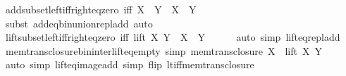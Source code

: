 \begin{isabellebody}
\ add{\isacharunderscore}{\kern0pt}subset{\isacharunderscore}{\kern0pt}left{\isacharunderscore}{\kern0pt}iff{\isacharunderscore}{\kern0pt}right{\isacharunderscore}{\kern0pt}eq{\isacharunderscore}{\kern0pt}zero\ {\isacharbrackleft}{\kern0pt}iff{\isacharbrackright}{\kern0pt}{\isacharcolon}{\kern0pt}\ {\isachardoublequoteopen}X\ {\isacharplus}{\kern0pt}\ Y\ {\isasymsubseteq}\ X\ {\isasymlongleftrightarrow}\ Y\ {\isacharequal}{\kern0pt}\ {}{\isachardoublequoteclose}\isanewline
%
\isadelimproof
\ \ %
\endisadelimproof
%
\isatagproof
{}\isamarkupfalse%
\ {\isacharparenleft}{\kern0pt}subst\ add{\isacharunderscore}{\kern0pt}eq{\isacharunderscore}{\kern0pt}bin{\isacharunderscore}{\kern0pt}union{\isacharunderscore}{\kern0pt}repl{\isacharunderscore}{\kern0pt}add{\isacharparenright}{\kern0pt}\ auto%
\endisatagproof
{\isafoldproof}%
%
\isadelimproof
\isanewline
%
\endisadelimproof
\isanewline
{}\isamarkupfalse%
\ lift{\isacharunderscore}{\kern0pt}subset{\isacharunderscore}{\kern0pt}left{\isacharunderscore}{\kern0pt}iff{\isacharunderscore}{\kern0pt}right{\isacharunderscore}{\kern0pt}eq{\isacharunderscore}{\kern0pt}zero\ {\isacharbrackleft}{\kern0pt}iff{\isacharbrackright}{\kern0pt}{\isacharcolon}{\kern0pt}\ {\isachardoublequoteopen}lift\ X\ Y\ {\isasymsubseteq}\ X\ {\isasymlongleftrightarrow}\ Y\ {\isacharequal}{\kern0pt}\ {}{\isachardoublequoteclose}\isanewline
%
\isadelimproof
\ \ %
\endisadelimproof
%
\isatagproof
{}\isamarkupfalse%
\ {\isacharparenleft}{\kern0pt}auto\ simp{\isacharcolon}{\kern0pt}\ lift{\isacharunderscore}{\kern0pt}eq{\isacharunderscore}{\kern0pt}repl{\isacharunderscore}{\kern0pt}add{\isacharparenright}{\kern0pt}%
\endisatagproof
{\isafoldproof}%
%
\isadelimproof
\isanewline
%
\endisadelimproof
\isanewline
{}\isamarkupfalse%
\ mem{\isacharunderscore}{\kern0pt}trans{\isacharunderscore}{\kern0pt}closure{\isacharunderscore}{\kern0pt}bin{\isacharunderscore}{\kern0pt}inter{\isacharunderscore}{\kern0pt}lift{\isacharunderscore}{\kern0pt}eq{\isacharunderscore}{\kern0pt}empty\ {\isacharbrackleft}{\kern0pt}simp{\isacharbrackright}{\kern0pt}{\isacharcolon}{\kern0pt}\ {\isachardoublequoteopen}mem{\isacharunderscore}{\kern0pt}trans{\isacharunderscore}{\kern0pt}closure\ X\ {\isasyminter}\ lift\ X\ Y\ {\isacharequal}{\kern0pt}\ {\isacharbraceleft}{\kern0pt}{\isacharbraceright}{\kern0pt}{\isachardoublequoteclose}\isanewline
%
\isadelimproof
\ \ %
\endisadelimproof
%
\isatagproof
{}\isamarkupfalse%
\ {\isacharparenleft}{\kern0pt}auto\ simp{\isacharcolon}{\kern0pt}\ lift{\isacharunderscore}{\kern0pt}eq{\isacharunderscore}{\kern0pt}image{\isacharunderscore}{\kern0pt}add\ simp\ flip{\isacharcolon}{\kern0pt}\ lt{\isacharunderscore}{\kern0pt}iff{\isacharunderscore}{\kern0pt}mem{\isacharunderscore}{\kern0pt}trans{\isacharunderscore}{\kern0pt}closure{\isacharparenright}{\kern0pt}%

\end{isabellebody}
